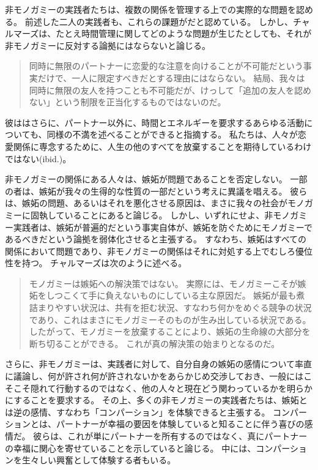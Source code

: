 \documentclass[paper=a4,book,openany]{jlreq}
\begin{document}
非モノガミーの実践者たちは、複数の関係を管理する上での実際的な問題を認める。
前述した二人の実践者も、これらの課題がだと認めている。
しかし、チャルマーズは、たとえ時間管理に関してどのような問題が生じたとしても、それが非モノガミーに反対する論拠にはならないと論じる。

\begin{quote}
同時に無限のパートナーに恋愛的な注意を向けることが不可能だという事実だけで、一人に限定すべきだとする理由にはならない。
結局、我々は同時に無限の友人を持つことも不可能だが、けっして「追加の友人を認めない」という制限を正当化するものではないのだ。
\citep[p.232]{chalmers19:_is_monog_moral_permis}

\end{quote}

彼ははさらに、パートナー以外に、時間とエネルギーを要求するあらゆる活動についても、同様の不満を述べることができると指摘する。
私たちは、人々が恋愛関係に専念するために、人生の他のすべてを放棄することを期待しているわけではない(ibid.)。

非モノガミーの関係にある人々は、嫉妬が問題であることを否定しない。
一部の者は、嫉妬が我々の生得的な性質の一部だという考えに異議を唱える。
彼らは、嫉妬の問題、あるいはそれを悪化させる原因は、まさに我々の社会がモノガミーに固執していることにあると論じる。
しかし、いずれにせよ、非モノガミー実践者は、嫉妬が普遍的だという事実自体が、嫉妬を防ぐためにモノガミーであるべきだという論拠を弱体化させると主張する。
すなわち、嫉妬はすべての関係において問題であり、非モノガミーの関係はそれに対処する上でむしろ優位性を持つ。
チャルマーズは次のように述べる。

\begin{quote}
モノガミーは嫉妬への解決策ではない。
実際には、モノガミーこそが嫉妬をしつこくて手に負えないものにしている主な原因だ。
嫉妬が最も煮詰まりやすい状況は、共有を拒む状況、すなわち何かをめぐる競争の状況であり、これはまさにモノガミーそのものが生み出している状況である。
したがって、モノガミーを放棄することにより、嫉妬の生命線の大部分を断ち切ることができる。
これが真の解決策の始まりとなるのだ。
\citep[p.237]{chalmers19:_is_monog_moral_permis}
\end{quote}

さらに、非モノガミーは、実践者に対して、自分自身の嫉妬の感情について率直に議論し、何が許され何が許されないかをあらかじめ交渉しておき、一般にはこそこそ隠れて行動するのではなく、他の人々と現在どう関わっているかを明らかにすることを要求する。
その上、多くの非モノガミーの実践者たちは、嫉妬とは逆の感情、すなわち「コンパーション」を体験できると主張する。
コンパーションとは、パートナーが幸福の要因を体験していると知ることに伴う喜びの感情だ。
彼らは、これが単にパートナーを所有するのではなく、真にパートナーの幸福に関心を寄せていることを示していると論じる。
中には、コンパーションを生々しい興奮として体験する者もいる\citep{sousa18:_love_jealous_comper}。
\end{document}
